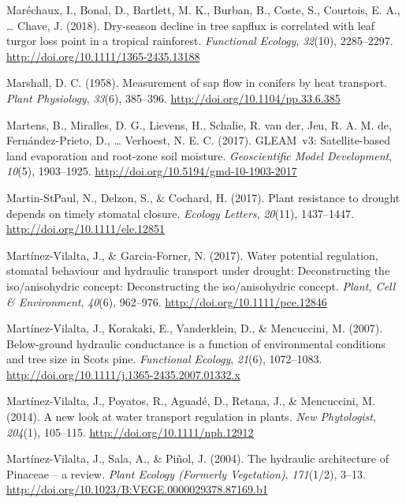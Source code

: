\documentclass[11pt,twoside]{reedthesis}
\begin{document}
\hypertarget{ref-marechaux_dryseason_2018}{}
Maréchaux, I., Bonal, D., Bartlett, M. K., Burban, B., Coste, S.,
Courtois, E. A., \ldots{} Chave, J. (2018). Dry‐season decline in tree
sapflux is correlated with leaf turgor loss point in a tropical
rainforest. \emph{Functional Ecology}, \emph{32}(10), 2285--2297.
\url{http://doi.org/10.1111/1365-2435.13188}

\hypertarget{ref-Marshall1958}{}
Marshall, D. C. (1958). Measurement of sap flow in conifers by heat
transport. \emph{Plant Physiology}, \emph{33}(6), 385--396.
\url{http://doi.org/10.1104/pp.33.6.385}

\hypertarget{ref-Martens2017}{}
Martens, B., Miralles, D. G., Lievens, H., Schalie, R. van der, Jeu, R.
A. M. de, Fernández-Prieto, D., \ldots{} Verhoest, N. E. C. (2017).
GLEAM~v3: Satellite-based land evaporation and root-zone soil moisture.
\emph{Geoscientific Model Development}, \emph{10}(5), 1903--1925.
\url{http://doi.org/10.5194/gmd-10-1903-2017}

\hypertarget{ref-martin-stpaul2017}{}
Martin-StPaul, N., Delzon, S., \& Cochard, H. (2017). Plant resistance
to drought depends on timely stomatal closure. \emph{Ecology Letters},
\emph{20}(11), 1437--1447. \url{http://doi.org/10.1111/ele.12851}

\hypertarget{ref-martinez-vilalta_water_2017}{}
Martínez-Vilalta, J., \& Garcia-Forner, N. (2017). Water potential
regulation, stomatal behaviour and hydraulic transport under drought:
Deconstructing the iso/anisohydric concept: Deconstructing the
iso/anisohydric concept. \emph{Plant, Cell \& Environment},
\emph{40}(6), 962--976. \url{http://doi.org/10.1111/pce.12846}

\hypertarget{ref-Martinez-Vilalta2007}{}
Martínez-Vilalta, J., Korakaki, E., Vanderklein, D., \& Mencuccini, M.
(2007). Below-ground hydraulic conductance is a function of
environmental conditions and tree size in Scots pine. \emph{Functional
Ecology}, \emph{21}(6), 1072--1083.
\url{http://doi.org/10.1111/j.1365-2435.2007.01332.x}

\hypertarget{ref-martinez-vilalta_new_2014}{}
Martínez-Vilalta, J., Poyatos, R., Aguadé, D., Retana, J., \&
Mencuccini, M. (2014). A new look at water transport regulation in
plants. \emph{New Phytologist}, \emph{204}(1), 105--115.
\url{http://doi.org/10.1111/nph.12912}

\hypertarget{ref-martinez-vilalta_hydraulic_2004}{}
Martínez-Vilalta, J., Sala, A., \& Piñol, J. (2004). The hydraulic
architecture of Pinaceae -- a review. \emph{Plant Ecology (Formerly
Vegetation)}, \emph{171}(1/2), 3--13.
\url{http://doi.org/10.1023/B:VEGE.0000029378.87169.b1}
\end{document}
